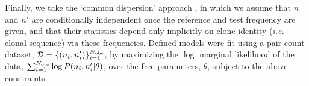 \documentclass[letterpaper,english,prl,reprint,longbibliography]{revtex4-1} %
\begin{document}



Finally, we take the `common dispersion' approach \citep{Robinson2008}, in which we assume that $n$ and $n'$ are conditionally independent once the reference and test frequency are given, and that their statistics depend only implicitly on clone identity (\emph{i.e.} clonal sequence) via these frequencies.
Defined models were fit using a pair count dataset, $\mathcal{D}=\{(n_i,n'_i)\}_{i=1}^{N_{\textrm{\textrm{obs}}}}$, by maximizing the $\log$ marginal likelihood of the data, $\sum_{i=1}^{N_{\textrm{\textrm{obs}}}} \log P(n_i,n'_i|\theta)$, over the free parameters, $\theta$, subject to the above constraints.
\end{document}
